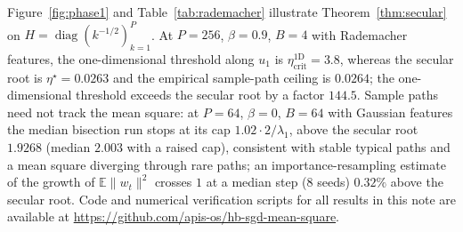 \documentclass[11pt]{article}
\theoremstyle{remark}
\newcommand{\E}{\mathbb{E}}
\begin{document}
Figure~\ref{fig:phase1} and Table~\ref{tab:rademacher} illustrate Theorem~\ref{thm:secular} on $H = \operatorname{diag}(k^{-1/2})_{k=1}^P$. At $P=256$, $\beta=0.9$, $B=4$ with Rademacher features, the one-dimensional threshold along $u_1$ is $\eta_{\mathrm{crit}}^{\mathrm{1D}} = 3.8$, whereas the secular root is $\eta^\star = 0.0263$ and the empirical sample-path ceiling is $0.0264$; the one-dimensional threshold exceeds the secular root by a factor $144.5$. Sample paths need not track the mean square: at $P=64$, $\beta=0$, $B=64$ with Gaussian features the median bisection run stops at its cap $1.02\cdot2/\lambda_1$, above the secular root $1.9268$ (median $2.003$ with a raised cap), consistent with stable typical paths and a mean square diverging through rare paths; an importance-resampling estimate of the growth of $\E\|w_t\|^2$ crosses $1$ at a median step (8 seeds) $0.32\%$ above the secular root. Code and numerical verification scripts for all results in this note are available at \url{https://github.com/apis-os/hb-sgd-mean-square}.

\renewcommand{\bibfont}{\footnotesize}\setlength{\bibsep}{0pt}


\end{document}
